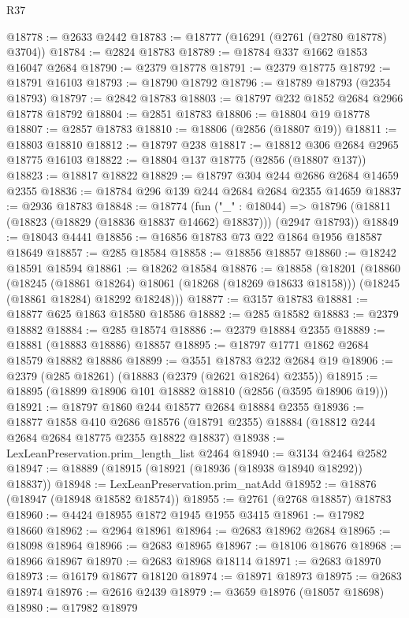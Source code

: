 \begin{lexlean}{R37}
\begin{coremodule}
@18778 := @2633 @2442
@18783 := @18777 (@16291 (@2761 (@2780 @18778) @3704))
@18784 := @2824 @18783
@18789 := @18784 @337 @1662 @1853 @16047 @2684
@18790 := @2379 @18778
@18791 := @2379 @18775
@18792 := @18791 @16103
@18793 := @18790 @18792
@18796 := @18789 @18793 (@2354 @18793)
@18797 := @2842 @18783
@18803 := @18797 @232 @1852 @2684 @2966 @18778 @18792
@18804 := @2851 @18783
@18806 := @18804 @19 @18778
@18807 := @2857 @18783
@18810 := @18806 (@2856 (@18807 @19))
@18811 := @18803 @18810
@18812 := @18797 @238
@18817 := @18812 @306 @2684 @2965 @18775 @16103
@18822 := @18804 @137 @18775 (@2856 (@18807 @137))
@18823 := @18817 @18822
@18829 := @18797 @304 @244 @2686 @2684 @14659 @2355
@18836 := @18784 @296 @139 @244 @2684 @2684 @2355 @14659
@18837 := @2936 @18783
@18848 := @18774
    (fun ("_" : @18044) =>
    @18796 (@18811 (@18823 (@18829 (@18836 @18837 @14662) @18837))) (@2947 @18793))
@18849 := @18043 @4441
@18856 := @16856 @18783 @73 @22 @1864 @1956 @18587 @18649
@18857 := @285 @18584
@18858 := @18856 @18857
@18860 := @18242 @18591 @18594
@18861 := @18262 @18584
@18876 := @18858
    (@18201
      (@18860
        (@18245 (@18861 @18264) @18061 (@18268 (@18269 @18633 @18158)))
        (@18245 (@18861 @18284) @18292 @18248)))
@18877 := @3157 @18783
@18881 := @18877 @625 @1863 @18580 @18586
@18882 := @285 @18582
@18883 := @2379 @18882
@18884 := @285 @18574
@18886 := @2379 @18884 @2355
@18889 := @18881 (@18883 @18886) @18857
@18895 := @18797 @1771 @1862 @2684 @18579 @18882 @18886
@18899 := @3551 @18783 @232 @2684 @19
@18906 := @2379 (@285 @18261) (@18883 (@2379 (@2621 @18264) @2355))
@18915 := @18895 (@18899 @18906 @101 @18882 @18810 (@2856 (@3595 @18906 @19)))
@18921 := @18797 @1860 @244 @18577 @2684 @18884 @2355
@18936 := @18877
    @1858
    @410
    @2686
    @18576
    (@18791 @2355)
    @18884
    (@18812 @244 @2684 @2684 @18775 @2355 @18822 @18837)
@18938 := LexLeanPreservation.prim_length_list @2464
@18940 := @3134 @2464 @2582
@18947 := @18889 (@18915 (@18921 (@18936 (@18938 @18940 @18292)) @18837))
@18948 := LexLeanPreservation.prim_natAdd
@18952 := @18876 (@18947 (@18948 @18582 @18574))
@18955 := @2761 (@2768 @18857) @18783
@18960 := @4424 @18955 @1872 @1945 @1955 @3415
@18961 := @17982 @18660
@18962 := @2964 @18961
@18964 := @2683 @18962 @2684
@18965 := @18098 @18964
@18966 := @2683 @18965
@18967 := @18106 @18676
@18968 := @18966 @18967
@18970 := @2683 @18968 @18114
@18971 := @2683 @18970
@18973 := @16179 @18677 @18120
@18974 := @18971 @18973
@18975 := @2683 @18974
@18976 := @2616 @2439
@18979 := @3659 @18976 (@18057 @18698)
@18980 := @17982 @18979

\end{coremodule}
\end{lexlean}
